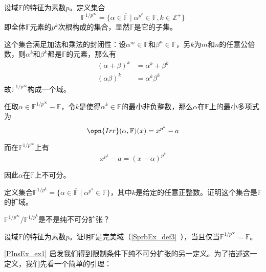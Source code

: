 \begin{example}{}\label{PInsEx_ex1}
设域$\mathbb{F}$的特征为素数$p$。定义集合
\begin{equation}
\mathbb{F}^{1/p^\infty} = \{\alpha\in\overline{\mathbb{F}}\mid \alpha^{p^k}\in\mathbb{F}, k\in\mathbb{Z}^+\}
\end{equation}
即全体$\mathbb{F}$元素的$p^k$次根构成的集合，显然$\mathbb{F}$是它的子集。

这个集合满足加法和乘法的封闭性：设$\alpha^m\in\mathbb{F}$和$\beta^n\in\mathbb{F}$，另$k$为$m$和$n$的任意公倍数，则$\alpha^k$和$\beta^k$都是$\mathbb{F}$的元素，那么有
\begin{equation}
\begin{aligned}
(\alpha+\beta)^k&=\alpha^k+\beta^k\\
(\alpha\beta)^k&=\alpha^k\beta^k
\end{aligned}
\end{equation}
故$\mathbb{F}^{1/p^\infty}$构成一个域。

任取$\alpha\in\mathbb{F}^{1/p^\infty}-\mathbb{F}$，令$k$是使得$\alpha^k\in\mathbb{F}$的最小非负整数，那么$\alpha$在$\mathbb{F}$上的最小多项式为
\begin{equation}
\opn{Irr}(\alpha, \mathbb{F})(x) = x^{p^k}-a
\end{equation}

而在$\mathbb{F}^{1/p^\infty}$上有
\begin{equation}
x^{p^k}-a = (x-\alpha)^{p^k}
\end{equation}

因此$\alpha$在$\mathbb{F}$上不可分。

\end{example}



\begin{exercise}{}
定义集合$\mathbb{F}^{1/p^k}=\{\alpha\in\overline{\mathbb{F}}\mid \alpha^{p^k}\in\mathbb{F}\}$，其中$k$是给定的任意正整数。证明这个集合是$\mathbb{F}$的扩域。

$\mathbb{F}^{1/p^\infty}/\mathbb{F}^{1/p^k}$是不是纯不可分扩张？
\end{exercise}


\begin{exercise}{}
设域$\mathbb{F}$的特征为素数$p$。证明$\mathbb{F}$是完美域（\autoref{SprbEx_def3}~），当且仅当$\mathbb{F}^{1/p^\infty}=\mathbb{F}$。
\end{exercise}



\autoref{PInsEx_ex1} 启发我们得到限制条件下纯不可分扩张的另一定义。为了描述这一定义，我们先看一个简单的引理：


